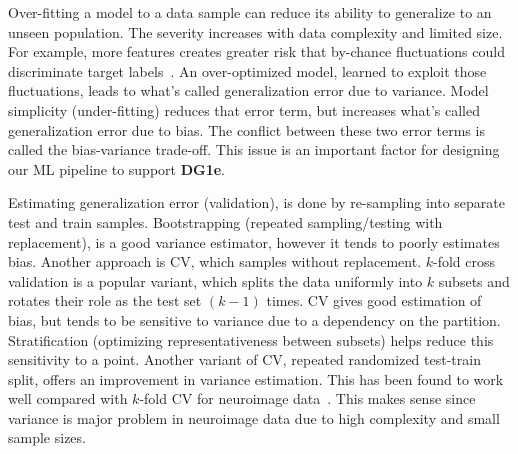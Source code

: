 
\noindent Over-fitting a model to a data sample can reduce its ability to generalize to an unseen population. The severity increases with data complexity and limited size. For example, more features creates greater risk that by-chance fluctuations could discriminate target labels~\cite{krawczuk2016feature}. An over-optimized model, learned to exploit those fluctuations, leads to what's called generalization error due to variance. Model simplicity (under-fitting) reduces that error term, but increases what's called generalization error due to bias.
The conflict between these two error terms is called the bias-variance trade-off. This issue is an important factor for designing our ML pipeline to support \textbf{DG1e}.

Estimating generalization error (validation), is done by re-sampling into separate test and train samples. Bootstrapping (repeated sampling/testing with replacement), is a good variance estimator, however it tends to poorly estimates bias. Another approach is CV, which samples without replacement. $k$-fold cross validation is a popular variant, which splits the data uniformly into $k$ subsets and rotates their role as the test set $(k-1)$ times. CV gives good estimation of bias, but tends to be sensitive to variance due to a dependency on the partition. Stratification (optimizing representativeness between subsets) helps reduce this sensitivity to a point. Another variant of CV, repeated randomized test-train split, offers an improvement in variance estimation. This has been found to work well compared with $k$-fold CV for neuroimage data~\cite{varoquaux2017assessing}. This makes sense since variance is major problem in neuroimage data due to high complexity and small sample sizes. 

